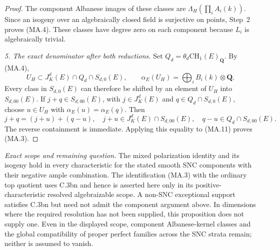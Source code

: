 \begin{proof}
The component Albanese images of these classes are
$\Lambda_H(\prod_iA_i(k))$. Since an isogeny over an
algebraically closed field is surjective on points,
Step~2 proves (MA.4). These classes have degree zero on
each component because $L_i$ is algebraically trivial.

\emph{5. The exact denominator after both reductions.}
Set $Q_d=\theta_d\mathrm{CH}_1(E)_{\mathbf Q}$.
By (MA.4),
\[
 U_H\subset J_K^d(E)\cap Q_d\cap S_{d,0}(E),\qquad
 \alpha_E(U_H)=\bigoplus_iB_i(k)\otimes\mathbf Q.
\]
Every class in $S_{d,0}(E)$ can therefore be shifted by an
element of $U_H$ into $S_{d,00}(E)$.
If $j+q\in S_{d,00}(E)$, with $j\in J_K^d(E)$ and
$q\in Q_d\cap S_{d,0}(E)$, choose $u\in U_H$ with
$\alpha_E(u)=\alpha_E(q)$. Then
\[
 j+q=(j+u)+(q-u),\quad
 j+u\in J_K^d(E)\cap S_{d,00}(E),\quad
 q-u\in Q_d\cap S_{d,00}(E).
\]
The reverse containment is immediate. Applying this equality
to (MA.11) proves (MA.3).
\end{proof}

\emph{Exact scope and remaining question.}
The mixed polarization identity and its isogeny hold in every
characteristic for the stated smooth SNC components with their
negative ample combination. The identification (MA.3) with the
ordinary top quotient uses C.3bn and hence is asserted here only
in its positive-characteristic resolved algebraizable scope.
A non-SNC exceptional support satisfies C.3bn but need not admit
the component argument above. In dimensions where the required
resolution has not been supplied, this proposition does not
supply one. Even in the displayed scope, component Albanese-kernel
classes and the global compatibility of proper perfect families
across the SNC strata remain; neither is assumed to vanish.

